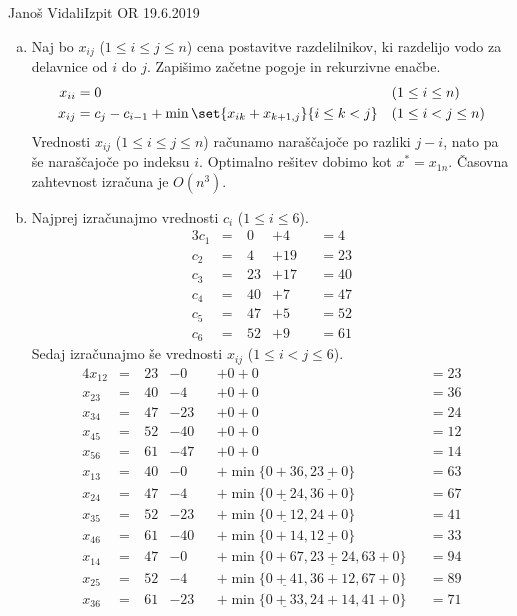 \begin{naloga}{Janoš Vidali}{Izpit OR 19.6.2019}
\begin{odgovor}
\begin{enumerate}[(a)]
\item Naj bo $x_{ij}$ ($1 \le i \le j \le n$) cena postavitve razdelilnikov,
ki razdelijo vodo za delavnice od $i$ do $j$.
Zapišimo začetne pogoje in rekurzivne enačbe.
\begin{align*}
x_{ii} &= 0 && (1 \le i \le n) \\
x_{ij} &= c_j - c_{i-1} + \min\set{x_{ik} + x_{k+1,j}}{i \le k < j}
&& (1 \le i < j \le n)
\end{align*}
Vrednosti $x_{ij}$ ($1 \le i \le j \le n$)
računamo naraščajoče po razliki $j-i$,
nato pa še naraščajoče po indeksu $i$.
Optimalno rešitev dobimo kot $x^* = x_{1n}$.
Časovna zahtevnost izračuna je $O(n^3)$.

\item Najprej izračunajmo vrednosti $c_i$ ($1 \le i \le 6$).
\begin{alignat*}{3}
c_1 &=\ &  0 &+  4 &&=  4 \\
c_2 &=\ &  4 &+ 19 &&= 23 \\
c_3 &=\ & 23 &+ 17 &&= 40 \\
c_4 &=\ & 40 &+  7 &&= 47 \\
c_5 &=\ & 47 &+  5 &&= 52 \\
c_6 &=\ & 52 &+  9 &&= 61
\end{alignat*}
Sedaj izračunajmo še vrednosti $x_{ij}$ ($1 \le i < j \le 6$).
\begin{alignat*}{4}
x_{12} &=\ &{} 23 &-  0 &&+ 0 + 0 &&= 23 \\
x_{23} &=\ &{} 40 &-  4 &&+ 0 + 0 &&= 36 \\
x_{34} &=\ &{} 47 &- 23 &&+ 0 + 0 &&= 24 \\
x_{45} &=\ &{} 52 &- 40 &&+ 0 + 0 &&= 12 \\
x_{56} &=\ &{} 61 &- 47 &&+ 0 + 0 &&= 14 \\
x_{13} &=\ &{} 40 &-  0 &&+ \min\{0+36, \underline{23+0}\} &&= 63 \\
x_{24} &=\ &{} 47 &-  4 &&+ \min\{\underline{0+24}, 36+0\} &&= 67 \\
x_{35} &=\ &{} 52 &- 23 &&+ \min\{\underline{0+12}, 24+0\} &&= 41 \\
x_{46} &=\ &{} 61 &- 40 &&+ \min\{0+14, \underline{12+0}\} &&= 33 \\
x_{14} &=\ &{} 47 &-  0 &&+ \min\{0+67, \underline{23+24}, 63+0\} &&= 94 \\
x_{25} &=\ &{} 52 &-  4 &&+ \min\{\underline{0+41}, 36+12, 67+0\} &&= 89 \\
x_{36} &=\ &{} 61 &- 23 &&+ \min\{\underline{0+33}, 24+14, 41+0\} &&= 71 \\

\end{alignat*}
\end{enumerate}
\end{odgovor}
\end{naloga}
